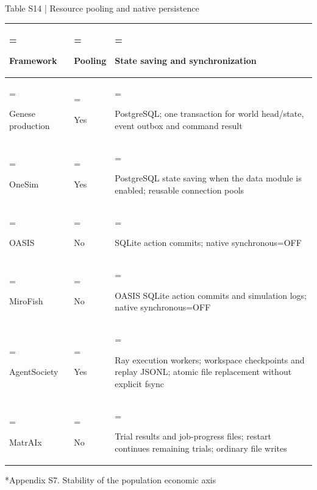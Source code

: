\documentclass[10pt]{article}
\makeatletter
\renewcommand\section{\@startsection{section}{1}{\z@}{-2.2ex plus -1ex minus -.2ex}{.9ex plus .2ex}{\normalfont\large\mdseries}}
\makeatother
\begin{document}
\begin{center}
\begin{minipage}{\textwidth}
\fontsize{8.5}{10.3}\selectfont
Table S14 | Resource pooling and native persistence
\par\vspace{4pt}
\begin{tabularx}{\textwidth}{@{}>{\hsize=0.570000\hsize\linewidth=\hsize\raggedright\arraybackslash}X>{\hsize=0.330000\hsize\linewidth=\hsize\raggedright\arraybackslash}X>{\hsize=2.100000\hsize\linewidth=\hsize\raggedright\arraybackslash}X@{}}
\toprule
Framework & Pooling & State saving and synchronization \\
\midrule
Genese production & Yes & PostgreSQL; one transaction for world head/state, event outbox and command result \\
OneSim & Yes & PostgreSQL state saving when the data module is enabled; reusable connection pools \\
OASIS & No & SQLite action commits; native synchronous=OFF \\
MiroFish & No & OASIS SQLite action commits and simulation logs; native synchronous=OFF \\
AgentSociety & Yes & Ray execution workers; workspace checkpoints and replay JSONL; atomic file replacement without explicit fsync \\
MatrAIx & No & Trial results and job-progress files; restart continues remaining trials; ordinary file writes \\
\bottomrule
\end{tabularx}
\par{}
\end{minipage}
\end{center}

\section*{Appendix S7. Stability of the population economic axis}
\end{document}
